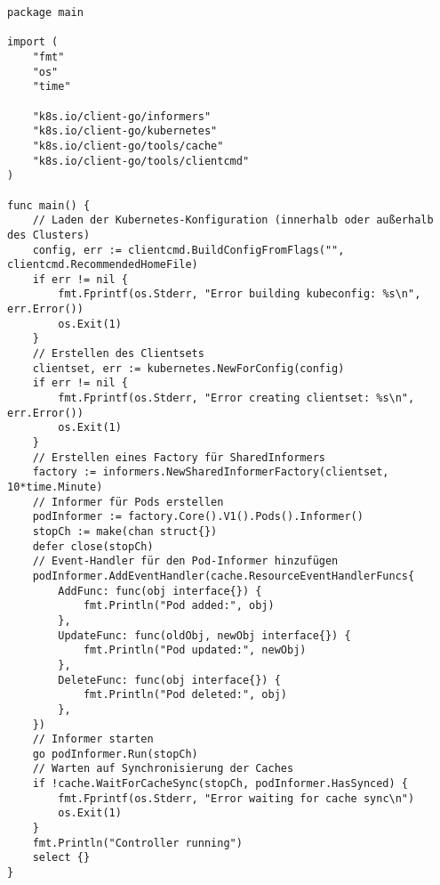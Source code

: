\begin{verbatim}
package main

import (
    "fmt"
    "os"
    "time"

    "k8s.io/client-go/informers"
    "k8s.io/client-go/kubernetes"
    "k8s.io/client-go/tools/cache"
    "k8s.io/client-go/tools/clientcmd"
)

func main() {
    // Laden der Kubernetes-Konfiguration (innerhalb oder außerhalb des Clusters)
    config, err := clientcmd.BuildConfigFromFlags("", clientcmd.RecommendedHomeFile)
    if err != nil {
        fmt.Fprintf(os.Stderr, "Error building kubeconfig: %s\n", err.Error())
        os.Exit(1)
    }
    // Erstellen des Clientsets
    clientset, err := kubernetes.NewForConfig(config)
    if err != nil {
        fmt.Fprintf(os.Stderr, "Error creating clientset: %s\n", err.Error())
        os.Exit(1)
    }
    // Erstellen eines Factory für SharedInformers
    factory := informers.NewSharedInformerFactory(clientset, 10*time.Minute)
    // Informer für Pods erstellen
    podInformer := factory.Core().V1().Pods().Informer()
    stopCh := make(chan struct{})
    defer close(stopCh)
    // Event-Handler für den Pod-Informer hinzufügen
    podInformer.AddEventHandler(cache.ResourceEventHandlerFuncs{
        AddFunc: func(obj interface{}) {
            fmt.Println("Pod added:", obj)
        },
        UpdateFunc: func(oldObj, newObj interface{}) {
            fmt.Println("Pod updated:", newObj)
        },
        DeleteFunc: func(obj interface{}) {
            fmt.Println("Pod deleted:", obj)
        },
    })
    // Informer starten
    go podInformer.Run(stopCh)
    // Warten auf Synchronisierung der Caches
    if !cache.WaitForCacheSync(stopCh, podInformer.HasSynced) {
        fmt.Fprintf(os.Stderr, "Error waiting for cache sync\n")
        os.Exit(1)
    }
    fmt.Println("Controller running")
    select {}
}

\end{verbatim}